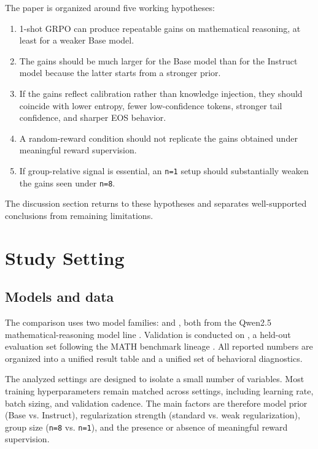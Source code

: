 \documentclass[12pt,a4paper]{ctexart}
\begin{document}
The paper is organized around five working hypotheses:

\begin{enumerate}
    \item 1-shot GRPO can produce repeatable gains on mathematical reasoning, at least for a weaker Base model.
    \item The gains should be much larger for the Base model than for the Instruct model because the latter starts from a stronger prior.
    \item If the gains reflect calibration rather than knowledge injection, they should coincide with lower entropy, fewer low-confidence tokens, stronger tail confidence, and sharper EOS behavior.
    \item A random-reward condition should not replicate the gains obtained under meaningful reward supervision.
    \item If group-relative signal is essential, an \texttt{n=1} setup should substantially weaken the gains seen under \texttt{n=8}.
\end{enumerate}

The discussion section returns to these hypotheses and separates well-supported conclusions from remaining limitations.

\section{Study Setting}

\subsection{Models and data}

The comparison uses two model families: \ModelBase{} and \ModelInstruct{}, both from the Qwen2.5 mathematical-reasoning model line \cite{qwen}. Validation is conducted on \EvalSet{}, a held-out evaluation set following the MATH benchmark lineage \cite{math}. All reported numbers are organized into a unified result table and a unified set of behavioral diagnostics.

The analyzed settings are designed to isolate a small number of variables. Most training hyperparameters remain matched across settings, including learning rate, batch sizing, and validation cadence. The main factors are therefore model prior (Base vs. Instruct), regularization strength (standard vs. weak regularization), group size (\texttt{n=8} vs. \texttt{n=1}), and the presence or absence of meaningful reward supervision.
\end{document}
